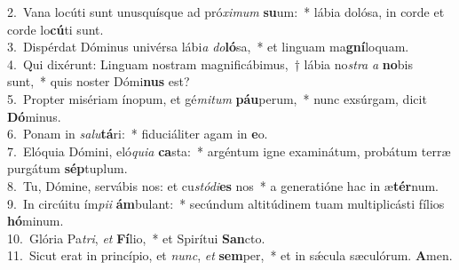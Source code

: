 {2.~}Vana locúti sunt unusquísque ad pró\textit{xi}\textit{mum} \textbf{su}um:~* lábia dolósa, in corde et corde lo\textbf{cú}ti sunt.\\
{3.~}Dispérdat Dóminus univérsa lábi\textit{a} \textit{do}\textbf{ló}sa,~* et linguam ma\textbf{gní}loquam.\\
{4.~}Qui dixérunt: Linguam nostram magnificábimus,~† lábia no\textit{stra} \textit{a} \textbf{no}bis sunt,~* quis noster Dómi\textbf{nus} est?\\
{5.~}Propter misériam ínopum, et gé\textit{mi}\textit{tum} \textbf{páu}perum,~* nunc exsúrgam, dicit \textbf{Dó}minus.\\
{6.~}Ponam in \textit{sa}\textit{lu}\textbf{tá}ri:~* fiduciáliter agam in \textbf{e}o.\\
{7.~}Elóquia Dómini, eló\textit{qui}\textit{a} \textbf{ca}sta:~* argéntum igne examinátum, probátum terræ purgátum \textbf{sép}tuplum.\\
{8.~}Tu, Dómine, servábis nos: et cu\textit{stó}\textit{di}\textbf{es} nos~* a generatióne hac in æ\textbf{tér}num.\\
{9.~}In circúitu ím\textit{pi}\textit{i} \textbf{ám}bulant:~* secúndum altitúdinem tuam multiplicásti fílios \textbf{hó}minum.\\
{10.~}Glória Pa\textit{tri}, \textit{et} \textbf{Fí}lio,~* et Spirítui \textbf{San}cto.\\
{11.~}Sicut erat in princípio, et \textit{nunc}, \textit{et} \textbf{sem}per,~* et in sǽcula sæculórum. \textbf{A}men.\\

